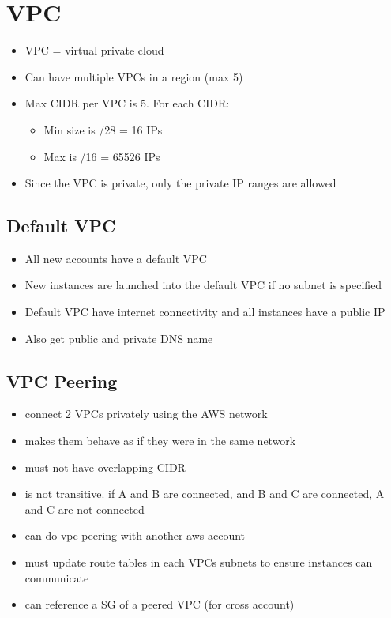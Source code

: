 \documentclass[]{scrartcl}
\begin{document}
\section{VPC}
\begin{itemize}
	\item VPC = virtual private cloud
	\item Can have multiple VPCs in a region (max 5)
	\item Max CIDR per VPC is 5. For each CIDR:
	\begin{itemize}
		\item Min size is /28 = 16 IPs
		\item Max is /16 = 65526 IPs
	\end{itemize}
	\item Since the VPC is private, only the private IP ranges are allowed
\end{itemize}

\subsection{Default VPC}
\begin{itemize}
	\item All new accounts have a default VPC
	\item New instances are launched into the default VPC if no subnet is specified
	\item Default VPC have internet connectivity and all instances have a public IP
	\item Also get public and private DNS name
\end{itemize}

\subsection{VPC Peering}
\begin{itemize}
	\item connect 2 VPCs privately using the AWS network
	\item makes them behave as if they were in the same network
	\item must not have overlapping CIDR
	\item is not transitive. if A and B are connected, and B and C are connected, A and C are not connected
	\item can do vpc peering with another aws account
	\item must update route tables in each VPCs subnets to ensure instances can communicate
	\item can reference a SG of a peered VPC (for cross account)
\end{itemize}
\end{document}
